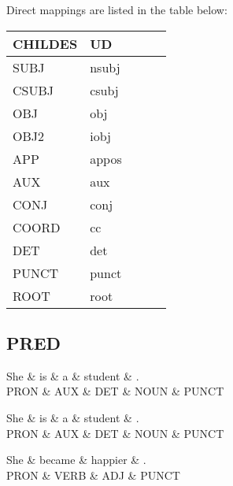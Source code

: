 Direct mappings are listed in the table below:
\begin{table}[h!]
\begin{tabular}{@{}lllll@{}}
\toprule
\textbf{CHILDES} & \textbf{UD} & \\ \midrule
SUBJ & nsubj & \\
CSUBJ & csubj & \\
OBJ & obj & \\
OBJ2 & iobj & \\
APP & appos & \\
AUX & aux & \\
CONJ & conj & \\
COORD & cc & \\
DET & det & \\
PUNCT & punct & \\
ROOT & root & \\\bottomrule
\end{tabular}
\end{table}


\subsection{PRED}
\begin{dependency}
    \begin{deptext}
    She \& is \& a \& student \& .\\
    PRON \& AUX \& DET \& NOUN \& PUNCT\\
    \end{deptext}
\end{dependency}

\begin{dependency}
    \begin{deptext}
    She \& is \& a \& student \& .\\
    PRON \& AUX \& DET \& NOUN \& PUNCT\\
    \end{deptext}
\end{dependency}

\begin{dependency}
    \begin{deptext}
    She \& became \& happier \& .\\
    PRON \& VERB \& ADJ \& PUNCT\\
    \end{deptext}
\end{dependency}


